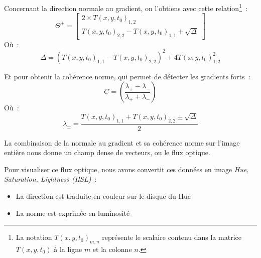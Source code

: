 \documentclass[fleqn,10pt]{SelfArx} %
\newcommand{\T}{T(x, y, t_{0})}
\newcommand{\Gx}{G_{x}(x,y,t_{0})}
\newcommand{\Gy}{G_{y}(x,y,t_{0})}
\begin{document}
Concernant la direction normale au gradient, on l'obtiens avec cette relation\footnote{La notation $\T_{m,n}$
représente le scalaire contenu dans la matrice $\T$ à la ligne $m$ et la colonne $n$.}~:
\[
    \Theta^{+} = 
    \begin{bmatrix}
        2 \times \T_{1,2} \\
        \T_{2,2} - \T_{1,1} + \sqrt{\Delta}
    \end{bmatrix}
\]
Où~:
\[
    \Delta = (\T_{1,1} - \T_{2,2})^{2} + 4 \T_{1,2}^{2}
\]

Et pour obtenir la cohérence norme, qui permet de détecter les gradients forts~:
\[
    C = \left(\frac{\lambda_{+} - \lambda_{-}}{\lambda_{+} + \lambda_{-}}\right)
\]
Où~:
\[
    \lambda_{\pm} = \frac{\T_{1,1} + \T_{2,2} \pm \sqrt{\Delta}}{2}
\]

La combinaison de la normale au gradient et sa cohérence norme sur l'image entière nous donne un champ 
dense de vecteurs, ou le flux optique.

Pour visualiser ce flux optique, nous avons convertit ces données en image {\em Hue,
Saturation, Lightness (HSL)}~:
\begin{itemize}
    \item La direction est traduite en couleur sur le disque du Hue
    \item La norme est exprimée en luminosité
\end{itemize}
\end{document}
